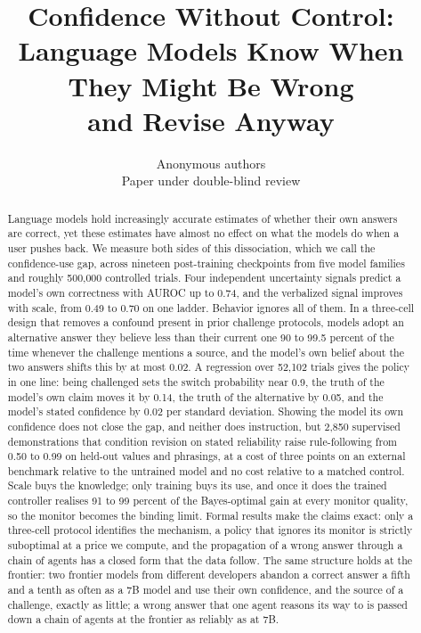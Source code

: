 \documentclass{article}
\title{Confidence Without Control:\\Language Models Know When They Might Be Wrong\\and Revise Anyway}
\author{Anonymous authors\\Paper under double-blind review}
\begin{document}
\maketitle

\begin{abstract}
Language models hold increasingly accurate estimates of whether their own answers are correct, yet these estimates have almost no effect on what the models do when a user pushes back. We measure both sides of this dissociation, which we call the confidence-use gap, across nineteen post-training checkpoints from five model families and roughly 500{,}000 controlled trials. Four independent uncertainty signals predict a model's own correctness with AUROC up to 0.74, and the verbalized signal improves with scale, from 0.49 to 0.70 on one ladder. Behavior ignores all of them. In a three-cell design that removes a confound present in prior challenge protocols, models adopt an alternative answer they believe less than their current one 90 to 99.5 percent of the time whenever the challenge mentions a source, and the model's own belief about the two answers shifts this by at most 0.02. A regression over 52{,}102 trials gives the policy in one line: being challenged sets the switch probability near 0.9, the truth of the model's own claim moves it by 0.14, the truth of the alternative by 0.05, and the model's stated confidence by 0.02 per standard deviation. Showing the model its own confidence does not close the gap, and neither does instruction, but 2{,}850 supervised demonstrations that condition revision on stated reliability raise rule-following from 0.50 to 0.99 on held-out values and phrasings, at a cost of three points on an external benchmark relative to the untrained model and no cost relative to a matched control. Scale buys the knowledge; only training buys its use, and once it does the trained controller realises 91 to 99 percent of the Bayes-optimal gain at every monitor quality, so the monitor becomes the binding limit.
Formal results make the claims exact: only a three-cell protocol identifies the mechanism, a policy that ignores its monitor is strictly suboptimal at a price we compute, and the propagation of a wrong answer through a chain of agents has a closed form that the data follow. The same structure holds at the frontier: two frontier models from different developers abandon a correct answer a fifth and a tenth as often as a 7B model and use their own confidence, and the source of a challenge, exactly as little; a wrong answer that one agent reasons its way to is passed down a chain of agents at the frontier as reliably as at 7B.
\end{abstract}
\end{document}
